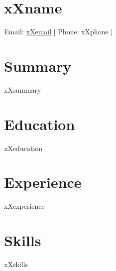 \documentclass[11pt]{article}
\begin{document}
\section*{\Huge xXname}

\noindent
Email: \href{mailto:xXemail}{{xXemail}} | 
Phone: xXphone | 

\section*{Summary}
xXsummary

\section*{Education}
\begin{itemize}[leftmargin=*]
xXeducation
\end{itemize}

\section*{Experience}
\begin{itemize}[leftmargin=*]
xXexperience
\end{itemize}

\section*{Skills}
xXskills
\end{document}
